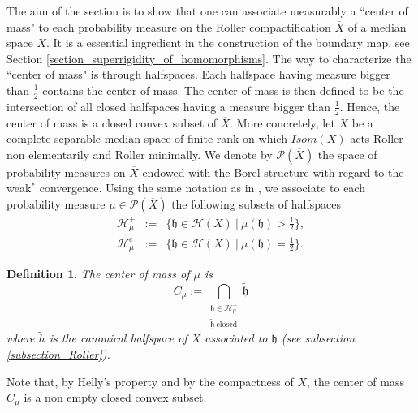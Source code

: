 \documentclass{amsart}
\numberwithin{equation}{section}
\newtheorem{defi}[thm]{Definition}
\newcommand{\HH}{\mathcal{H}}     %
\newcommand{\hh}{\mathfrak{h}}    %
\newcommand{\PP}{\mathcal{P}}     %
\theoremstyle{definition}
\def\bar{\overline}
\begin{document}
 The aim of the section is to show that one can associate measurably a ``center of mass" to each probability measure on the Roller compactification $\bar{X}$ of a median space $X$. It is a essential ingredient in the construction of the boundary map, see Section \ref{section_superrigidity_of_homomorphisms}. The way to characterize the ``center of mass" is through halfspaces. Each halfspace having measure bigger than $\frac{1}{2}$ contains the center of mass. The center of mass is then defined to be the intersection of all closed halfspaces having a measure bigger than $\frac{1}{2}$. Hence, the center of mass is a closed convex subset of $\bar X$. More concretely, let $X$ be a complete separable median space of finite rank on which $Isom(X)$ acts Roller non elementarily and Roller minimally. We denote by $\PP(\bar X)$ the space of probability measures on $\bar X$ endowed with the Borel structure with regard to the weak$^*$ convergence. Using the same notation as in \cite{ChaIF}, we associate to each probability measure $\mu\in\PP(\bar{X})$ the following subsets of halfspaces 
\begin{eqnarray*}
\HH_\mu^+ &:=& \{\hh\in\HH(X)\ | \ \mu(\hh)>\frac{1}{2}\},\\
\HH_\mu^e &:=& \{\hh\in \HH(X)\ | \ \mu(\hh)=\frac{1}{2}\}.
\end{eqnarray*}
\begin{defi}
    
The center of mass of $\mu$ is
$$
C_\mu     := \bigcap_{\substack{\hh\in\HH_\mu^+ \\ \tilde{\hh} \ \text{closed}}} \tilde{\hh}
$$
where $\tilde{h}$ is the canonical halfspace of $\bar X$ associated to $\hh$ (see subsection \ref{subsection_Roller}).
\end{defi} 
Note that, by Helly's property and by the compactness of $\bar X$, the center of mass $C_\mu$ is a non empty closed convex subset. \par 
\end{document}

